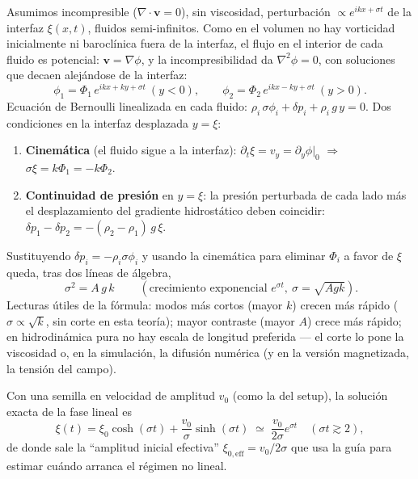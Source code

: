 \documentclass[11pt,a4paper]{article}
\newcommand{\vct}{\mathbf{v}}
\newcommand{\dif}{\partial_t}
\begin{document}
Asumimos incompresible ($\nabla\cdot\vct=0$), sin viscosidad, perturbación
$\propto e^{ikx+\sigma t}$ de la interfaz $\xi(x,t)$, fluidos semi-infinitos. Como en el
volumen no hay vorticidad inicialmente ni baroclínica fuera de la interfaz, el flujo en el
interior de cada fluido es potencial: $\vct=\nabla\phi$, y la incompresibilidad da
$\nabla^2\phi=0$, con soluciones que decaen alejándose de la interfaz:
\begin{equation}
\phi_1=\Phi_1\,e^{ikx+ky+\sigma t}\ (y<0),
\qquad
\phi_2=\Phi_2\,e^{ikx-ky+\sigma t}\ (y>0).
\end{equation}
Ecuación de Bernoulli linealizada en cada fluido:
$\rho_i\,\sigma\phi_i + \delta p_i + \rho_i\,g\,y = 0$. Dos condiciones en la interfaz
desplazada $y=\xi$:
\begin{enumerate}[nosep]
  \item \textbf{Cinemática} (el fluido sigue a la interfaz):
  $\dif{\xi}=v_y=\partial_y\phi|_{0}$ $\Rightarrow$ $\sigma\xi=k\Phi_1=-k\Phi_2$.
  \item \textbf{Continuidad de presión} en $y=\xi$: la presión perturbada de cada lado más
  el desplazamiento del gradiente hidrostático deben coincidir:
  $\delta p_1-\delta p_2 = -(\rho_2-\rho_1)\,g\,\xi$.
\end{enumerate}
Sustituyendo $\delta p_i=-\rho_i\sigma\phi_i$ y usando la cinemática para eliminar
$\Phi_i$ a favor de $\xi$ queda, tras dos líneas de álgebra,
\begin{equation}
\boxed{\ \sigma^2 = A\,g\,k\ } \qquad
(\text{crecimiento exponencial } e^{\sigma t},\ \sigma=\sqrt{Agk}).
\label{eq:sigma-hd}
\end{equation}
Lecturas útiles de la fórmula: modos más cortos (mayor $k$) crecen más rápido
($\sigma\propto\sqrt{k}$, sin corte en esta teoría); mayor contraste (mayor $A$) crece más
rápido; en hidrodinámica pura no hay escala de longitud preferida --- el corte lo pone la
viscosidad o, en la simulación, la difusión numérica (y en la versión magnetizada, la
tensión del campo).

Con una semilla en velocidad de amplitud $v_0$ (como la del setup), la solución exacta de
la fase lineal es
\begin{equation}
\xi(t)=\xi_0\cosh(\sigma t)+\frac{v_0}{\sigma}\sinh(\sigma t)
\;\simeq\;\frac{v_0}{2\sigma}e^{\sigma t}\quad (\sigma t\gtrsim2),
\end{equation}
de donde sale la ``amplitud inicial efectiva'' $\xi_{0,\mathrm{eff}}=v_0/2\sigma$ que usa la
guía para estimar cuándo arranca el régimen no lineal.
\end{document}
